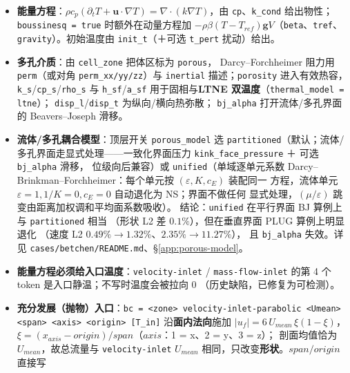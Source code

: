 \documentclass[11pt,a4paper]{ctexart}
\begin{document}
\begin{itemize}\itemsep2pt
  \item \textbf{能量方程}：$\rho c_p(\partial_t T + \mathbf{u}\cdot\nabla T)
        = \nabla\cdot(k\nabla T)$，由 \texttt{cp}、\texttt{k\_cond} 给出物性；
        \texttt{boussinesq = true} 时额外在动量方程加
        $-\rho\beta(T-T_{ref})\mathbf{g}V$（\texttt{beta}、\texttt{tref}、
        \texttt{gravity}）。初始温度由 \texttt{init\_t}（＋可选
        \texttt{t\_pert} 扰动）给出。
  \item \textbf{多孔介质}：由 \texttt{cell\_zone} 把体区标为 \texttt{porous}，
        Darcy--Forchheimer 阻力用 \texttt{perm}（或对角
        \texttt{perm\_xx/yy/zz}）与 \texttt{inertial} 描述；\texttt{porosity}
        进入有效热容，
        \texttt{k\_s}/\texttt{cp\_s}/\texttt{rho\_s} 与 \texttt{h\_sf}/\texttt{a\_sf}
        用于固相与\textbf{LTNE 双温度}（\texttt{thermal\_model = ltne}）；
        \texttt{disp\_l}/\texttt{disp\_t} 为纵向/横向热弥散；
        \texttt{bj\_alpha} 打开流体/多孔界面的 Beavers--Joseph 滑移。
  \item \textbf{流体/多孔耦合模型}：顶层开关 \texttt{porous\_model} 选
        \texttt{partitioned}（默认；流体/多孔界面走显式处理——一致化界面压力
        \texttt{kink\_face\_pressure} ＋ 可选 \texttt{bj\_alpha} 滑移，
        位级向后兼容）或 \texttt{unified}（单域逐单元系数
        Darcy--Brinkman--Forchheimer：每个单元按 $(\varepsilon,K,c_E)$ 装配同一
        方程，流体单元 $\varepsilon=1,1/K=0,c_E=0$ 自动退化为 NS；界面不做任何
        显式处理，$(\mu/\varepsilon)$ 跳变由距离加权调和平均面系数吸收）。
        结论：\texttt{unified} 在平行界面 BJ 算例上与 \texttt{partitioned} 相当
        （形状 L2 差 $0.1\%$），但在垂直界面 PLUG 算例上明显退化
        （速度 L2 $0.49\%\!\to\!1.32\%$、$2.35\%\!\to\!11.27\%$），
        且 \texttt{bj\_alpha} 失效。详见
        \texttt{cases/betchen/README.md}、\S\ref{app:porous-model}。
  \item \textbf{能量方程必须给入口温度}：\texttt{velocity-inlet} /
        \texttt{mass-flow-inlet} 的第 4 个 token 是入口静温；不写时温度会被拉向 0
        （历史缺陷，已修复为可检测）。
  \item \textbf{充分发展（抛物）入口}：\texttt{bc = <zone>
        velocity-inlet-parabolic <Umean> <span> <axis> <origin> [T\_in]}
        沿\textbf{面内法向}施加 $|u_f| = 6\,U_{mean}\,\xi(1-\xi)$，
        $\xi = (x_{axis}-origin)/span$（$axis$：1 = x、2 = y、3 = z）；
        剖面均值恰为 $U_{mean}$，故总流量与 \texttt{velocity-inlet}
        $U_{mean}$ 相同，只改变\textbf{形状}。$span/origin$ 直接写

\end{itemize}
\end{document}
